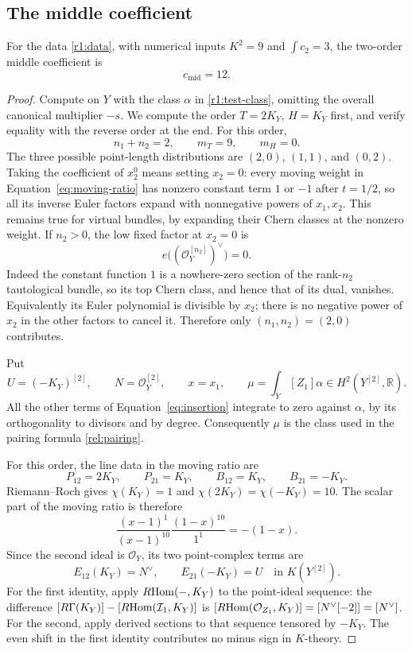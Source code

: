 \subsection{The middle coefficient}

\begin{lemma}\label{lem:middle-coefficient}
For the data \eqref{r1:data}, with numerical inputs
$K^2=9$ and $\int c_2=3$, the two-order middle coefficient is
\[
 c_{\mathrm{mid}}=12.
\]
\end{lemma}

\begin{proof}
Compute on $Y$ with the class $\alpha$ in \eqref{r1:test-class},
omitting the overall canonical multiplier $-s$. We compute the order
$T=2K_Y$, $H=K_Y$ first, and verify equality with the reverse order
at the end. For this order,
\[
 n_1+n_2=2,\qquad m_T=9,\qquad m_H=0.
\]
The three possible point-length distributions are $(2,0)$, $(1,1)$,
and $(0,2)$.  Taking the coefficient of $x_2^0$ means setting
$x_2=0$: every moving weight in
Equation~\eqref{eq:moving-ratio} has nonzero constant term $1$ or
$-1$ after $t=1/2$, so all its inverse Euler factors expand with
nonnegative powers of $x_1,x_2$.  This remains true for virtual
bundles, by expanding their Chern classes at the nonzero weight.
If $n_2>0$, the low fixed factor at $x_2=0$ is
\[
 e\bigl((\mathcal O_Y^{[n_2]})^\vee\bigr)=0.
\]
Indeed the constant function $1$ is a nowhere-zero section of the
rank-$n_2$ tautological bundle, so its top Chern class, and hence
that of its dual, vanishes.  Equivalently its Euler polynomial is
divisible by $x_2$; there is no negative power of $x_2$ in the other
factors to cancel it.  Therefore only $(n_1,n_2)=(2,0)$ contributes.

Put
\[
 U=(-K_Y)^{[2]},\qquad N=\mathcal O_Y^{[2]},\qquad x=x_1,
 \qquad
 \mu=\int_Y[Z_1]\alpha\in H^2(Y^{[2]},\mathbb R).
\]
All the other terms of Equation~\eqref{eq:insertion} integrate to
zero against $\alpha$, by its orthogonality to divisors and by
degree.  Consequently $\mu$ is the class used in the pairing
formula \eqref{rel:pairing}.

For this order, the line data in the moving ratio are
\[
 P_{12}=2K_Y,\qquad P_{21}=K_Y,\qquad
 B_{12}=K_Y,\qquad B_{21}=-K_Y.
\]
Riemann--Roch gives
$\chi(K_Y)=1$ and $\chi(2K_Y)=\chi(-K_Y)=10$.  The scalar part of
the moving ratio is therefore
\begin{equation}\label{r1:scalar-ratio}
 \frac{(x-1)^1}{(x-1)^{10}}
 \frac{(1-x)^{10}}{1^1}=-(1-x).
\end{equation}
Since the second ideal is $\mathcal O_Y$, its two point-complex
terms are
\begin{equation}\label{r1:point-complexes}
 E_{12}(K_Y)=N^\vee,\qquad E_{21}(-K_Y)=U
 \quad\text{in }K(Y^{[2]}).
\end{equation}
For the first identity, apply $R\!\operatorname{Hom}(-,K_Y)$ to the point-ideal
sequence: the difference
$[R\Gamma(K_Y)]-[R\!\operatorname{Hom}(\mathcal I_1,K_Y)]$ is
$[R\!\operatorname{Hom}(\mathcal O_{Z_1},K_Y)]=[N^\vee[-2]]=[N^\vee]$.
For the second, apply derived sections to that sequence tensored
by $-K_Y$.  The even shift in the first identity contributes no
minus sign in $K$-theory.


\end{proof}
